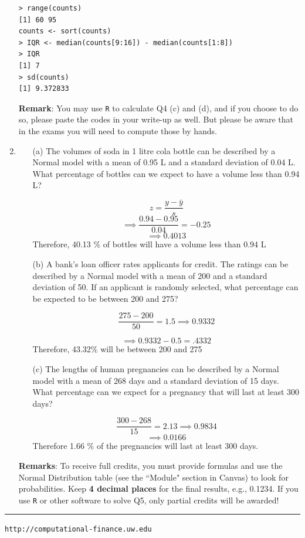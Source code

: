 \documentclass[letterpaper,12pt]{article}
\begin{document}
\begin{enumerate}
\begin{lstlisting}
> range(counts)
[1] 60 95
counts <- sort(counts)
> IQR <- median(counts[9:16]) - median(counts[1:8])
> IQR
[1] 7
> sd(counts)
[1] 9.372833
\end{lstlisting}

\textbf{Remark}: You may use \verb=R= to calculate Q4 (c) and (d), and if you choose to do so, please paste the codes in your write-up as well.
But please be aware that in the exams you will need to compute those by hands.

\item 
\begin{itemize}
\item[(a)] The volumes of soda in 1 litre cola bottle can be described by a Normal model with a mean of 0.95 L and a standard deviation of 0.04 L. What percentage of bottles can we expect to have a volume less than 0.94 L?

\[
	z = \frac{y-\bar{y}}{s} 
\]
\[
	\implies \frac{0.94-0.95}{0.04} = -0.25
\]
\[
	\implies 0.4013
\]
Therefore, 40.13 \% of bottles will have a volume less than 0.94 L

\item[(b)] A bank's loan officer rates applicants for credit. The ratings can be described by a Normal model with a mean of 200 and a standard deviation of 50. If an applicant is randomly selected, what percentage can be expected to be between 200 and 275?

\[
	\frac{275-200}{50} = 1.5 \implies 0.9332
\]

\[
	\implies 0.9332 - 0.5 = .4332
\]
Therefore, 43.32\% will be between 200 and 275
\item[(c)] The lengths of human pregnancies can be described by a Normal model with a mean of 268 days and a standard deviation of 15 days. What percentage can we expect for a pregnancy that will last at least 300 days?

\[
	\frac{300-268}{15} = 2.13 \implies 0.9834
\]
\[
	\implies 0.0166
\]
Therefore 1.66 \% of the pregnancies will last at least 300 days.
\end{itemize}
\textbf{Remarks}: To receive full credits, you must provide formulas and use 
the Normal Distribution table (see the ``Module" section in Canvas) to look for probabilities. Keep \textbf{4 decimal places} for the final results, e.g., 0.1234. If you use \verb=R= or other software to solve Q5, only partial credits will be awarded!

\end{enumerate}


\vfill \hrule \vspace{2mm} \centerline {\tt \tiny http://computational-finance.uw.edu}
\end{document}
